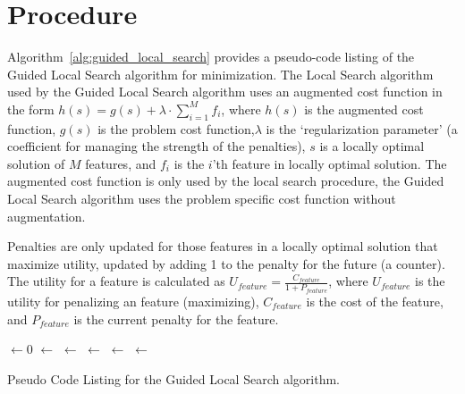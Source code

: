 \documentclass[a4paper, 11pt]{article}
\begin{document}
\section{Procedure}
\label{sec:procedure}
Algorithm~\ref{alg:guided_local_search} provides a pseudo-code listing of the Guided Local Search algorithm for minimization. 
The Local Search algorithm used by the Guided Local Search algorithm uses an augmented cost function in the form  $h(s)=g(s)+\lambda\cdot\sum_{i=1}^{M}f_i$, where 
$h(s)$ is the augmented cost function, $g(s)$ is the problem cost function,$\lambda$ is the `regularization parameter' (a coefficient for managing the strength of the penalties), $s$ is a locally optimal solution of $M$ features, and $f_i$ is the $i$'th feature in locally optimal solution. The augmented cost function is only used by the local search procedure, the Guided Local Search algorithm uses the problem specific cost function without augmentation.

Penalties are only updated for those features in a locally optimal solution that maximize utility, updated by adding 1 to the penalty for the future (a counter). 
The utility for a feature is calculated as $U_{feature}=\frac{C_{feature}}{1+P_{feature}}$, where $U_{feature}$ is the utility for penalizing an feature (maximizing), $C_{feature}$ is the cost of the feature, and $P_{feature}$ is the current penalty for the feature.

\begin{algorithm}[htp]
	\SetLine
	\KwIn{\NumIterations, \RegularizationParameter}
	\KwOut{\Best}
	\FeaturePenalties $\leftarrow 0$\;
	\Best $\leftarrow$ \RandomSolution{}\;
	\ForEach{\CurrentIteration $\in$ \NumIterations} {
		\Candidate $\leftarrow$ \LocalSearch{\Best, \RegularizationParameter, \FeaturePenalties}\;	
		\FeatureUtilities $\leftarrow$ \CalculateFeatureUtilities{\Candidate, \FeaturePenalties}\;
		\FeaturePenalties $\leftarrow$ \UpdateFeaturePenalties{\Candidate, \FeaturePenalties, \FeatureUtilities}\;
		\If{\Cost{\Candidate} $\leq$ \Cost{\Best}} {
			\Best $\leftarrow$ \Candidate\;
		}
	}
	\Return{\Best}\;
	\caption{Pseudo Code Listing for the Guided Local Search algorithm.}
	\label{alg:guided_local_search}
\end{algorithm}
\end{document}
